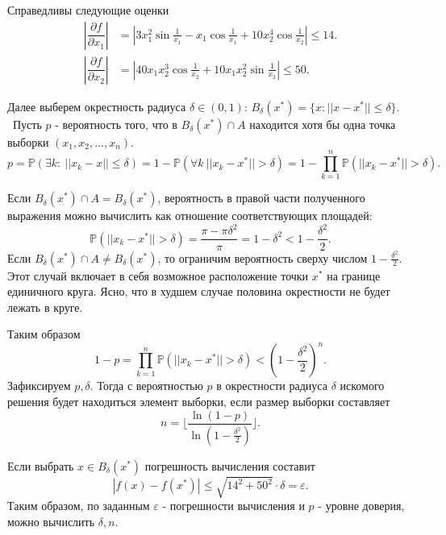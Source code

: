 \documentclass[11pt]{report}
\begin{document}
Справедливы следующие оценки
$$
\begin{aligned}
\left|\dfrac{\partial f}{\partial x_1}\right| &= \left| 3x_1^2\sin\frac{1}{x_1} - x_1\cos\frac{1}{x_1} + 10x_2^4\cos\frac{1}{x_2}  \right| \leqslant 14. \\
\left|\dfrac{\partial f}{\partial x_2}\right| &= \left| 40x_1x_2^3\cos\frac{1}{x_2} + 10x_1x_2^2\sin\frac{1}{x_2} \right| \leqslant 50.
\end{aligned}
$$

Далее выберем окрестность радиуса $\delta\in(0,1)$: $B_\delta(x^*)=\{ x: ||x-x^*||\leqslant \delta \}$. \
Пусть $p$ - вероятность того, что в $B_\delta(x^*) \cap A$ находится хотя бы одна точка выборки $(x_1,x_2,\dots,x_n)$.
$$
p = \mathbb{P}(\exists k:~||x_k-x||\leqslant\delta) = 1 - \mathbb{P}(\forall k~ ||x_k-x^*||>\delta) = 1 - \prod_{k=1}^n\mathbb{P}(||x_k-x^*||>\delta).
$$

Если $B_\delta(x^*) \cap A = B_\delta(x^*)$, вероятность в правой части полученного выражения можно вычислить как отношение соответствующих площадей:
$$
\mathbb{P}(||x_k-x^*||>\delta) = \dfrac{\pi - \pi\delta^2}{\pi} = 1 - \delta^2 < 1 - \frac{\delta^2}{2}.
$$
Если $B_\delta(x^*) \cap A \neq B_\delta(x^*)$, то ограничим вероятность сверху числом $1-\frac{\delta^2}{2}$. Этот случай включает в себя возможное расположение точки $x^*$ на границе единичного круга. Ясно, что в худшем случае половина окрестности не будет лежать в круге.

Таким образом
$$
1-p = \prod_{k=1}^n\mathbb{P}(||x_k-x^*||>\delta) < \left(1-\frac{\delta^2}{2}\right)^n.
$$
Зафиксируем $p, \delta$. Тогда с вероятностью $p$ в окрестности радиуса $\delta$ искомого решения будет находиться элемент выборки, если размер выборки составляет
$$
n = \bigg\lfloor\dfrac{\ln(1-p)}{\ln\left(1-\frac{\delta^2}{2}\right)}\bigg\rfloor.
$$

Если выбрать $x\in B_\delta(x^*)$ погрешность вычисления составит
$$
|f(x) - f(x^*)| \leqslant \sqrt{14^2 + 50^2}\cdot\delta = \varepsilon.
$$
Таким образом, по заданным $\varepsilon$ - погрешности вычисления и $p$ - уровне доверия, можно вычислить $\delta, n$.
\end{document}
